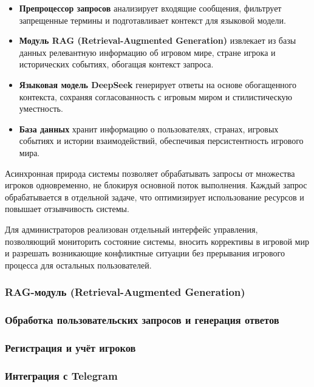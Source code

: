 \begin{itemize}
\item \textbf{Препроцессор запросов} анализирует входящие сообщения, фильтрует запрещенные термины и подготавливает контекст для языковой модели.

\item \textbf{Модуль RAG (Retrieval-Augmented Generation)} извлекает из базы данных релевантную информацию об игровом мире, стране игрока и исторических событиях, обогащая контекст запроса.

\item \textbf{Языковая модель DeepSeek} генерирует ответы на основе обогащенного контекста, сохраняя согласованность с игровым миром и стилистическую уместность.

\item \textbf{База данных} хранит информацию о пользователях, странах, игровых событиях и истории взаимодействий, обеспечивая персистентность игрового мира.
\end{itemize}

Асинхронная природа системы позволяет обрабатывать запросы от множества игроков одновременно, не блокируя основной поток выполнения. Каждый запрос обрабатывается в отдельной задаче, что оптимизирует использование ресурсов и повышает отзывчивость системы.

Для администраторов реализован отдельный интерфейс управления, позволяющий мониторить состояние системы, вносить коррективы в игровой мир и разрешать возникающие конфликтные ситуации без прерывания игрового процесса для остальных пользователей.

\subsubsection{RAG-модуль (Retrieval-Augmented Generation)}

\subsubsection{Обработка пользовательских запросов и генерация ответов}

\subsubsection{Регистрация и учёт игроков}

\subsubsection{Интеграция с Telegram}

